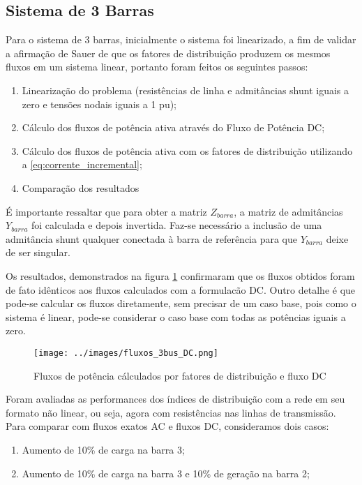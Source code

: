 \documentclass[journal]{IEEEtran}
\begin{document}
\subsection{Sistema de 3 Barras}
Para o sistema de 3 barras, inicialmente o sistema foi linearizado, a fim de validar a afirmação de Sauer de que os fatores de distribuição produzem os mesmos fluxos em um sistema linear, portanto foram feitos os seguintes passos:
\begin{enumerate}
  \item Linearização do problema (resistências de linha e admitâncias shunt iguais a zero e tensões nodais iguais a 1 pu);
  \item Cálculo dos fluxos de potência ativa através do Fluxo de Potência DC;
  \item Cálculo dos fluxos de potência ativa com os fatores de distribuição utilizando a \eqref{eq:corrente_incremental};
  \item Comparação dos resultados
\end{enumerate}
É importante ressaltar que para obter a matriz $Z_{barra}$, a matriz de admitâncias $Y_{barra}$ foi calculada e depois invertida. Faz-se necessário a inclusão de uma admitância shunt qualquer conectada à barra de referência para que $Y_{barra}$ deixe de ser singular. 

Os resultados, demonstrados na figura \ref{fig:fluxo_3bus_dc} confirmaram que os fluxos obtidos foram de fato idênticos aos fluxos calculados com a formulacão DC. Outro detalhe é que pode-se calcular os fluxos diretamente, sem precisar de um caso base, pois como o sistema é linear, pode-se considerar o caso base com todas as potências iguais a zero.

\begin{figure}[H]
\centering
\texttt{[image: ../images/fluxos\_3bus\_DC.png]}
\caption{Fluxos de potência cálculados por fatores de distribuição e fluxo DC}
\label{fig:fluxo_3bus_dc}
\end{figure}

Foram avaliadas as performances dos índices de distribuição com a rede em seu formato não linear, ou seja, agora com resistências nas linhas de transmissão. Para comparar com fluxos exatos AC e fluxos DC, consideramos dois casos:
\begin{enumerate}
  \item Aumento de 10\% de carga na barra 3;
  \item Aumento de 10\% de carga na barra 3 e 10\% de geração na barra 2;
\end{enumerate} 
\end{document}
